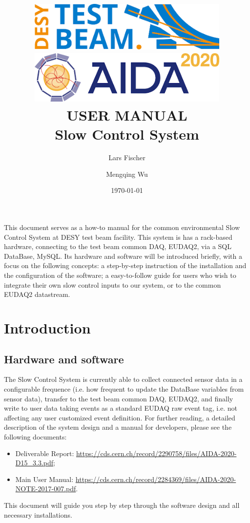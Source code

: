 \documentclass[a4paper,12pt]{scrartcl}
\title{\includegraphics[width=10cm]{DESYTestBeam.png}  \includegraphics[width=10cm]{Aida2020.png} \\ \vspace{2cm} USER MANUAL \\ Slow Control System}
\author[*]{Lars Fischer}
\author[*]{Mengqing Wu}
\affil[*]{Deutsches Elektronen-Synchrotron DESY, Notkestr. 85, 22607 Hamburg, Germany}
\date{\today}
\begin{document}
\clearpage\maketitle
This document serves as a how-to manual for the common environmental Slow Control System at DESY test beam facility. This system is has a rack-based hardware, connecting to the test beam common DAQ, EUDAQ2, via a SQL DataBase, MySQL.
Its hardware and software will be introduced briefly, with a focus on the following concepts:
a step-by-step instruction of the installation and the configuration of the software;
a easy-to-follow guide for users who wish to integrate their own slow control inputs to our system, or to the common EUDAQ2 datastream.
\thispagestyle{empty}
\cleardoublepage

\tableofcontents
\pagebreak

\section{Introduction}
\subsection{Hardware and software}
The Slow Control System is currently able to collect connected sensor data in a configurable frequence (i.e. how frequent to update the DataBase variables from sensor data), transfer to the test beam common DAQ, EUDAQ2, and finally write to user data taking events as a standard EUDAQ raw event tag, i.e. not affecting any user customized event definition.
For further reading, a detailed description of the system design and a manual for developers, please see the following documents:
\begin{itemize}
  \item Deliverable Report: \href{https://cds.cern.ch/record/2290758/files/AIDA-2020-D15\_3.3.pdf}{\footnotesize{https://cds.cern.ch/record/2290758/files/AIDA-2020-D15\_3.3.pdf}};
  \item Main User Manual: \href{https://cds.cern.ch/record/2284369/files/AIDA-2020-NOTE-2017-007.pdf}{\footnotesize{https://cds.cern.ch/record/2284369/files/AIDA-2020-NOTE-2017-007.pdf}}.
\end{itemize}
This document will guide you step by step through the software design and all necessary installations.
\end{document}

